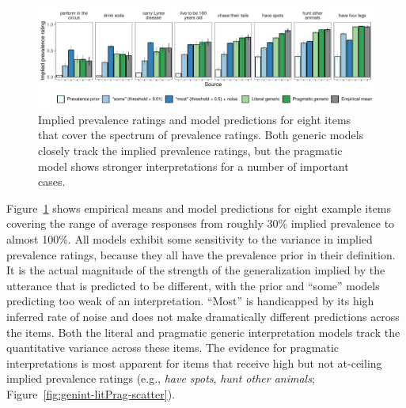 \documentclass[floatsintext,doc]{apa6}
\newcommand{\ndg}[1]{{\textcolor{Green}{[ndg: #1]}}}
\begin{document}
\begin{figure}
\centering
\includegraphics{genint_files/figure-latex/genint-modelingResults-bars-1.pdf}
\caption{Implied prevalence ratings and model predictions for eight items that cover the spectrum of prevalence ratings. 
Both generic models closely track the implied prevalence ratings, but the pragmatic model shows stronger interpretations for a number of important cases.}
\label{fig:genint-modelingResults-bars}
\end{figure}


Figure~\ref{fig:genint-modelingResults-bars} shows empirical means and model predictions for eight example items covering the range of average responses from roughly 30\% implied prevalence to almost 100\%.
All models exhibit some sensitivity to the variance in implied prevalence ratings, because they all have the prevalence prior in their definition.
It is the actual magnitude of the strength of the generalization implied by the utterance that is predicted to be different, with the prior and \enquote{some} models predicting too weak of an interpretation.
\enquote{Most} is handicapped by its high inferred rate of noise and does not make dramatically different predictions across the items.
Both the literal and pragmatic generic interpretation models track the quantitative variance across these items.
The evidence for pragmatic interpretations is most apparent for items that receive high but not at-ceiling implied prevalence ratings (e.g., \emph{have spots}, \emph{hunt other animals}; Figure~\ref{fig:genint-litPrag-scatter}).


\end{document}
